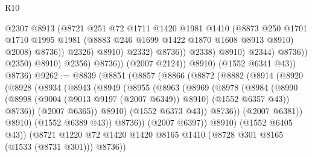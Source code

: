 \begin{lexlean}{R10}
\begin{coremodule}
                                            @2307
                                            @8913
                                            (@8721
                                              @251
                                              @72
                                              @1711
                                              @1420
                                              @1981
                                              @1410
                                              (@8873
                                                @250
                                                @1701
                                                @1710
                                                @1995
                                                @1981
                                                (@8883 @246 @1699 @1422 @1870 @1608 @8913 @8910)
                                                @2008)
                                              @8736))
                                          @2326)
                                        @8910)
                                      @2332)
                                    @8736))
                                @2338)
                              @8910)
                            @2344)
                          @8736))
                      @2350)
                    @8910)
                  @2356)
                @8736))
            (@2007 @2124))
          @8910)
        (@1552 @6341 @43))
      @8736)
@9262 := @8839
    (@8851
      (@8857
        (@8866
          (@8872
            (@8882
              (@8914
                (@8920
                  (@8928
                    (@8934
                      (@8943
                        (@8949
                          (@8955
                            (@8963
                              (@8969
                                (@8978
                                  (@8984
                                    (@8990
                                      (@8998
                                        (@9004 (@9013 @9197 (@2007 @6349)) @8910)
                                        (@1552 @6357 @43))
                                      @8736))
                                  (@2007 @6365))
                                @8910)
                              (@1552 @6373 @43))
                            @8736))
                        (@2007 @6381))
                      @8910)
                    (@1552 @6389 @43))
                  @8736))
              (@2007 @6397))
            @8910)
          (@1552 @6405 @43))
        (@8721 @1220 @72 @1420 @1420 @8165 @1410 (@8728 @301 @8165 (@1533 (@8731 @301))) @8736))

\end{coremodule}
\end{lexlean}
